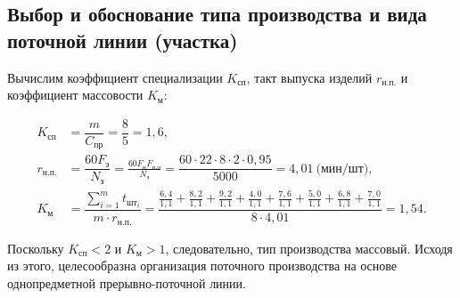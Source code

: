 \subsection{
  Выбор и обоснование типа производства и
  вида поточной линии (участка)
}

Вычислим коэффициент специализации \( K_{\text{сп}} \), 
такт выпуска изделий \( r_{\text{н.п.}}\) и
коэффициент массовости \( K_\text{м} \):

\begin{align*}
K_{\text{сп}} &= \dfrac{m}{C_{\text{пр}}} = \dfrac{8}{5} = 1{,}6, \\
r_{\text{н.п.}} &= \dfrac{60 F_{\text{э}}}{N_{\text{з}}} = 
  \frac{60 F_{\text{н}} F_{\text{п.о}}}{N_{\text{з}}} =
  \dfrac{60 \cdot 22 \cdot 8 \cdot 2 \cdot 0{,}95}{5000} =
  4{,}01 \: \text{(мин/шт)}, \\
K_{\text{м}} &=
\dfrac{\sum^m_{i=1} t_{\text{шт}_{i}}}{m \cdot r_{\text{н.п.}}} = 
\dfrac{
  \frac{6{,}4}{1{,}1} + \frac{8{,}2}{1{,}1} + \frac{9{,}2}{1{,}1} + 
  \frac{4{,}0}{1{,}1} + \frac{7{,}6}{1{,}1} + \frac{5{,}0}{1{,}1} +
  \frac{6{,}8}{1{,}1} + \frac{7{,}0}{1{,}1}
}{
  8 \cdot 4{,}01
} = 1{,}54.
\end{align*}

Поскольку \( K_{\text{сп}} < 2 \) и \( K_{\text{м}} > 1 \),
следовательно, тип производства массовый. Исходя из этого,
целесообразна организация поточного производства на основе
однопредметной прерывно-поточной линии.